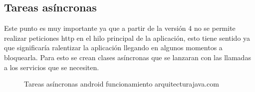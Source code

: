 \subsection{Tareas asíncronas}
\label{subsecc:Tareas asíncronas}

Este punto es muy importante ya que a partir de la versión 4 no se permite realizar peticiones http en el hilo principal de la aplicación, esto tiene sentido ya que significaría ralentizar la aplicación llegando en algunos momentos a bloquearla.
Para esto se crean clases asíncronas que se lanzaran con las llamadas a los servicios que se necesiten.

\begin{figure}[H] 
  \begin{center} 
    \caption{Tareas asíncronas android funcionamiento arquitecturajava.com} 
    \label{fig:TareasAsincronas} 
  \end{center} 
\end{figure}

